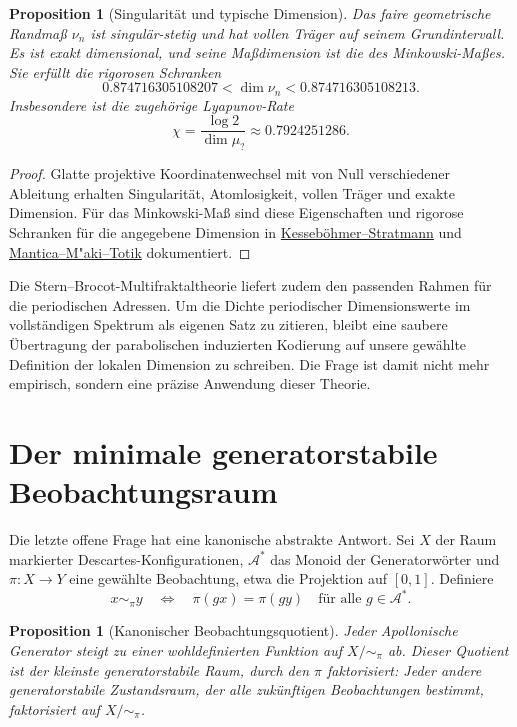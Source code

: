 \documentclass[11pt,a4paper]{article}
\newtheorem{proposition}[remark]{Proposition}
\begin{document}
\begin{proposition}[Singularität und typische Dimension]
Das faire geometrische Randmaß $\nu_n$ ist singulär-stetig und hat vollen
Träger auf seinem Grundintervall. Es ist exakt dimensional, und seine
Maßdimension ist die des Minkowski-Maßes. Sie erfüllt die rigorosen Schranken
\[
 0.874716305108207<\dim \nu_n<0.874716305108213.
\]
Insbesondere ist die zugehörige Lyapunov-Rate
\[
 \chi=\frac{\log2}{\dim\mu_{?}}
 \approx0.7924251286.
\]
\end{proposition}

\begin{proof}
Glatte projektive Koordinatenwechsel mit von Null verschiedener Ableitung
erhalten Singularität, Atomlosigkeit, vollen Träger und exakte Dimension.
Für das Minkowski-Maß sind diese Eigenschaften und rigorose Schranken für
die angegebene Dimension in
\href{https://arxiv.org/abs/0706.0453}{Kesseböhmer--Stratmann} und
\href{https://publicatio.bibl.u-szeged.hu/17247/1/corr3.pdf}{Mantica--M"{a}ki--Totik}
dokumentiert.
\end{proof}

Die Stern--Brocot-Multifraktaltheorie liefert zudem den passenden Rahmen für
die periodischen Adressen. Um die Dichte periodischer Dimensionswerte im
vollständigen Spektrum als eigenen Satz zu zitieren, bleibt eine saubere
Übertragung der parabolischen induzierten Kodierung auf unsere gewählte
Definition der lokalen Dimension zu schreiben. Die Frage ist damit nicht
mehr empirisch, sondern eine präzise Anwendung dieser Theorie.

\section{Der minimale generatorstabile Beobachtungsraum}

Die letzte offene Frage hat eine kanonische abstrakte Antwort. Sei $X$ der
Raum markierter Descartes-Konfigurationen, $\mathcal A^*$ das Monoid der
Generatorwörter und $\pi:X\to Y$ eine gewählte Beobachtung, etwa die
Projektion auf $[0,1]$. Definiere
\[
 x\sim_\pi y
 \quad\Longleftrightarrow\quad
 \pi(gx)=\pi(gy)\quad\text{für alle }g\in\mathcal A^*.
\]

\begin{proposition}[Kanonischer Beobachtungsquotient]
Jeder Apollonische Generator steigt zu einer wohldefinierten Funktion auf
$X/{\sim_\pi}$ ab. Dieser Quotient ist der kleinste generatorstabile Raum,
durch den $\pi$ faktorisiert: Jeder andere generatorstabile Zustandsraum,
der alle zukünftigen Beobachtungen bestimmt, faktorisiert auf
$X/{\sim_\pi}$.
\end{proposition}
\end{document}
